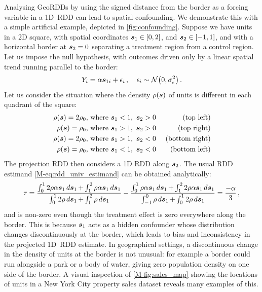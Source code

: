 \documentclass[letter,12pt]{article}
\begin{document}
Analysing GeoRDDs by using the signed distance from the border as a forcing variable in a 1D~RDD can lead to spatial confounding.
We demonstrate this with a simple artificial example, depicted in \autoref{fig:confounding}.
Suppose we have units in a 2D square, with spatial coordinates \(\bm{s}_1 \in [0,2]\), and \(\bm{s}_2 \in [-1,1]\), and with a horizontal border at \(\bm{s}_2=0\) separating a treatment region from a control region.
Let us impose the null hypothesis, with outcomes driven only by a linear spatial trend running parallel to the border:
\begin{equation}
    Y_{i} = \alpha \svec_{1i} + \epsilon_i \,,\quad\epsilon_i \sim \normal\del{0, \sigman^2}
    \,.
\end{equation}
Let us consider the situation where the density \(\rho(\bm{s})\) of units is different in each quadrant of the square:
\begin{equation}
    \begin{aligned}
        \rho(\bm{s}) = 2\rho_0 & \text{, where }\bm{s}_1 < 1,~\bm{s}_2 > 0 & \text{ (top left)} \\
        \rho(\bm{s}) = \rho_0 & \text{, where }\bm{s}_1 > 1,~\bm{s}_2 > 0 & \text{ (top right)} \\
        \rho(\bm{s}) = 2\rho_0 & \text{, where }\bm{s}_1 > 1,~\bm{s}_2 < 0 & \text{ (bottom right)}  \\
        \rho(\bm{s}) = \rho_0 & \text{, where }\bm{s}_1 < 1,~\bm{s}_2 < 0 & \text{ (bottom left)}
    \end{aligned}
\end{equation}
The projection RDD then considers a 1D RDD along \(\bm{s}_2\).
The usual RDD estimand \autoref*{M-eq:rdd_univ_estimand} can be obtained analytically:
\begin{equation}
    \tau = \frac{
            \int_{0}^{1}  2\rho \alpha \bm{s}_{1} \mathop{d \bm{s}}_{1} 
            + \int_{1}^{2}  \rho \alpha \bm{s}_{1} \mathop{d \bm{s}}_{1}
        }{
            \int_{0}^{1}  2\rho \mathop{d \bm{s}}_{1} 
            + \int_{1}^{2}  \rho \mathop{d \bm{s}}_{1}
        }
        -
        \frac{
            \int_{0}^{1} \rho \alpha \bm{s}_{1} \mathop{d \bm{s}}_{1} 
            + \int_{1}^{2} 2\rho \alpha \bm{s}_{1} \mathop{d \bm{s}}_{1}
        }{
            \int_{-1}^{0} \rho \mathop{d \bm{s}}_{1} 
            + \int_{0}^{1} 2\rho \mathop{d \bm{s}}_{1}
        }
    = \frac{-\alpha}{3}
    \,,
\end{equation}
and is non-zero even though the treatment effect is zero everywhere along the border.
This is because \(\bm{s}_1\) acts as a hidden confounder whose distribution changes discontinuously at the border, which leads to bias and inconsistency in the projected 1D~RDD estimate.
In geographical settings, a discontinuous change in the density of units at the border is not unusual: for example a border could run alongside a park or a body of water, giving zero population density on one side of the border.
A visual inspection of \autoref*{M-fig:sales_map} showing the locations of units in a New York City property sales dataset reveals many examples of this.
\end{document}
